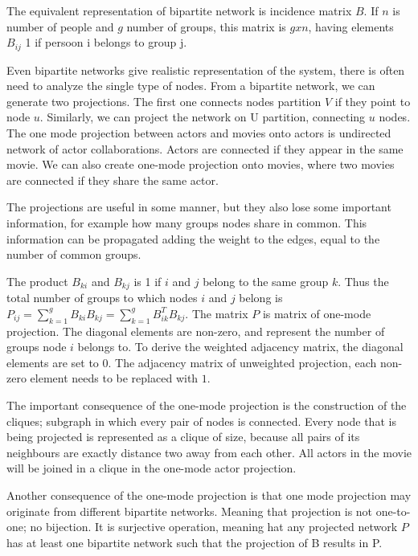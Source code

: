 The equivalent representation of bipartite network is incidence matrix $B$. If $n$ is number of people and $g$ number of groups, this matrix is $g x n$, having elements $B_{ij}$ 1 if persoon i belongs to group j. 

Even bipartite networks give realistic representation of the system, there is often need to analyze the single type of nodes.  From a bipartite network, we can generate two projections. The first one connects nodes partition $V$ if they point to node $u$. Similarly, we can project the network on U partition, connecting $u$ nodes. The one mode projection between actors and movies onto actors is undirected network of actor collaborations. Actors are connected if they appear in the same movie. We can also create one-mode projection onto movies, where two movies are connected if they share the same actor.  

The projections are useful in some manner, but they also lose some important information, for example how many groups nodes share in common. This information can be propagated adding the weight to the edges, equal to the number of common groups.

The product $B_{ki}$ and $B_{kj}$ is 1 if $i$ and $j$ belong to the same group $k$. Thus the total number of groups to which nodes $i$ and $j$ belong is $P_{ij} = \sum_{k=1}^g B_{ki}B_{kj} = \sum_{k=1}^g B_{ik}^TB_{kj}$. The matrix $P$ is matrix of one-mode projection. The diagonal elements are non-zero, and represent the number of groups node $i$ belongs to.  To derive the weighted adjacency matrix, the diagonal elements are set to 0. The adjacency matrix of unweighted projection, each non-zero element needs to be replaced with $1$. 

The important consequence of the one-mode projection is the construction of the cliques; subgraph in which every pair of nodes is connected. Every node that is being projected is represented as a clique of size, because all pairs of its neighbours are exactly distance two away from each other. All actors in the movie will be joined in a clique in the one-mode actor projection. %

Another consequence of the one-mode projection is that one mode projection may originate from different bipartite networks. Meaning that projection is not one-to-one; no bijection. It is surjective operation, meaning hat any projected network $P$ has at least one bipartite network such that the projection of B results in P. \\ %


